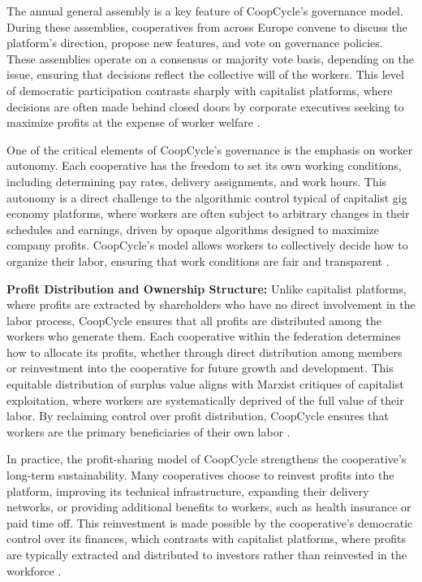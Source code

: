 \begin{refsection}
The annual general assembly is a key feature of CoopCycle’s governance model. During these assemblies, cooperatives from across Europe convene to discuss the platform’s direction, propose new features, and vote on governance policies. These assemblies operate on a consensus or majority vote basis, depending on the issue, ensuring that decisions reflect the collective will of the workers. This level of democratic participation contrasts sharply with capitalist platforms, where decisions are often made behind closed doors by corporate executives seeking to maximize profits at the expense of worker welfare \cite[pp.~77-90]{dardot2014}.

One of the critical elements of CoopCycle’s governance is the emphasis on worker autonomy. Each cooperative has the freedom to set its own working conditions, including determining pay rates, delivery assignments, and work hours. This autonomy is a direct challenge to the algorithmic control typical of capitalist gig economy platforms, where workers are often subject to arbitrary changes in their schedules and earnings, driven by opaque algorithms designed to maximize company profits. CoopCycle’s model allows workers to collectively decide how to organize their labor, ensuring that work conditions are fair and transparent \cite[pp.~120-136]{marx2018}.

\textbf{Profit Distribution and Ownership Structure:} Unlike capitalist platforms, where profits are extracted by shareholders who have no direct involvement in the labor process, CoopCycle ensures that all profits are distributed among the workers who generate them. Each cooperative within the federation determines how to allocate its profits, whether through direct distribution among members or reinvestment into the cooperative for future growth and development. This equitable distribution of surplus value aligns with Marxist critiques of capitalist exploitation, where workers are systematically deprived of the full value of their labor. By reclaiming control over profit distribution, CoopCycle ensures that workers are the primary beneficiaries of their own labor \cite[pp.~89-105]{mason2015}.

In practice, the profit-sharing model of CoopCycle strengthens the cooperative’s long-term sustainability. Many cooperatives choose to reinvest profits into the platform, improving its technical infrastructure, expanding their delivery networks, or providing additional benefits to workers, such as health insurance or paid time off. This reinvestment is made possible by the cooperative’s democratic control over its finances, which contrasts with capitalist platforms, where profits are typically extracted and distributed to investors rather than reinvested in the workforce \cite[pp.~77-90]{dardot2014}.


\end{refsection}
